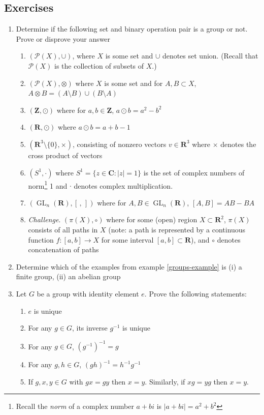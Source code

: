 \documentclass[12pt]{article}
\numberwithin{equation}{subsection}
\theoremstyle{note}
\newcommand{\GL}{\operatorname{GL}}
\begin{document}
\subsection{Exercises}
\begin{enumerate}[label=\arabic*.]
	\item Determine if the following set and binary operation pair is a group or not. Prove or disprove your answer
	\begin{enumerate}
		\item $(\mathcal{P}(X), \cup)$, where $X$ is some set and $\cup$ denotes set union. (Recall that $\mathcal{P}(X)$ is the collection of subsets of $X$.)
		\item $(\mathcal{P}(X),\otimes)$ where $X$ is some set and for $A,B\subset X$, $A\otimes B=(A\setminus B)\cup (B\setminus A)$
		\item $(\mathbf{Z}, \odot)$ where for $a,b\in \mathbf{Z}$, $a\odot b=a^2-b^2$
		\item $(\mathbf{R}, \odot)$ where $a\odot b=a+b-1$
		\item $(\mathbf{R}^3\setminus \{0\}, \times)$, consisting of nonzero vectors $v\in \mathbf{R}^3$ where $\times$ denotes the cross product of vectors
		\item $( S^1, \cdot)$ where $S^1=\{ z\in\mathbf{C} : |z|=1\}$ is the set of complex numbers of norm\footnote{Recall the \textit{norm} of a complex number $a+bi$ is $|a+bi|=a^2+b^2$} 1 and $\cdot$ denotes complex multiplication.
		\item $(\GL_n(\mathbf{R}), [\, , \,])$ where for $A,B\in \GL_n(\mathbf{R})$, $[A,B]=AB-BA$
		\item \textit{Challenge}. $(\pi(X), \circ)$ where for some (open) region $X\subset \mathbf{R}^2$, $\pi(X)$ consists of all paths in $X$ (note: a path is represented by a continuous function $f\colon [a,b]\to X$ for some interval $[a,b]\subset \mathbf{R}$), and $\circ$ denotes concatenation of paths
	\end{enumerate}
	
	\item Determine which of the examples from example \ref{groups-example} is (i) a finite group, (ii) an abelian group

	\item Let $G$ be a group with identity element $e$. Prove the following statements:
		\begin{enumerate}
			\item $e$ is unique
			\item For any $g\in G$, its inverse $g^{-1}$ is unique
			\item For any $g\in G$, $(g^{-1})^{-1}=g$
			\item For any $g,h\in G$, $(gh)^{-1}=h^{-1}g^{-1}$
			\item If $g,x,y\in G$ with $gx=gy$ then $x=y$. Similarly, if $xg=yg$ then $x=y$. 
		\end{enumerate}


\end{enumerate}
\end{document}

